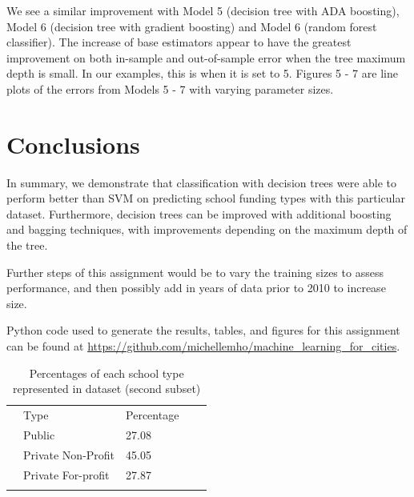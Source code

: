 \documentclass[10pt,twocolumn]{article}
\begin{document}
We see a similar improvement with Model 5 (decision tree with ADA boosting), Model 6
(decision tree with gradient boosting) and
Model 6 (random forest classifier). The increase of base estimators appear to have
the greatest improvement on both in-sample and out-of-sample error when the tree
maximum depth is small. In our examples, this is when it is set to 5. Figures 5 - 7
are line plots of the errors from Models 5 - 7 with varying parameter sizes.

\section{Conclusions}

In summary, we demonstrate that classification with decision trees
were able to perform better than SVM on predicting school funding types
with this particular dataset. Furthermore, decision trees can be improved
with additional boosting and bagging techniques, with improvements
depending on the maximum depth of the tree.

Further steps of this assignment would be to vary the training sizes to assess
performance, and then possibly add in years of data prior to 2010 to increase size.

Python code used to generate the results, tables, and figures for this assignment can be
found at \url{https://github.com/michellemho/machine_learning_for_cities}.


\begin{table}[ht]
\centering
\caption{Percentages of each school type represented in dataset (second subset)}
\label{my-label}
\begin{tabular}{lllll}
& Type                & Percentage &\\
& Public              & 27.08            & \\
& Private Non-Profit  & 45.05    & \\
& Private For-profit  & 27.87  & \\
                &                           &
\end{tabular}
\end{table}
\end{document}
